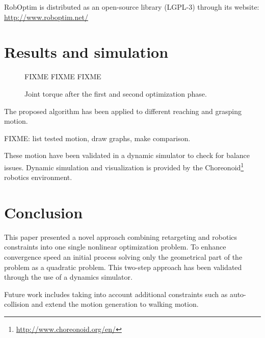 \documentclass[letterpaper, 10 pt, conference]{ieeeconf}  %
\begin{document}
RobOptim is distributed as an open-source library (\mbox{LGPL-3}) through its
website: \url{http://www.roboptim.net/}



\section{Results and simulation}
\label{sec:results}


\begin{figure}[htbp!]
  FIXME FIXME FIXME
  \label{fig:results-torque}
  \caption{Joint torque after the first and second optimization
    phase.}
\end{figure}



The proposed algorithm has been applied to different reaching and
grasping motion.


FIXME: list tested motion, draw graphs, make comparison.


These motion have been validated in a dynamic simulator to check for
balance issues. Dynamic simulation and visualization is provided by
the Choreonoid\footnote{\url{http://www.choreonoid.org/en/}} robotics
environment.



\section{Conclusion}
\label{sec:conclusion}

This paper presented a novel approach combining retargeting and
robotics constraints into one single nonlinear optimization
problem. To enhance convergence speed an initial process solving only
the geometrical part of the problem as a quadratic problem. This
two-step approach has been validated through the use of a dynamics
simulator.

Future work includes taking into account additional constraints such
as auto-collision and extend the motion generation to walking motion.

\end{document}

